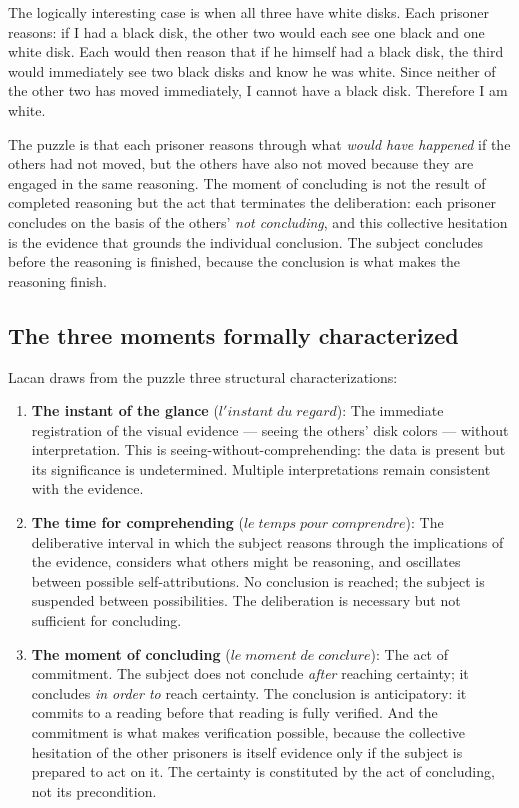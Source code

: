 \documentclass[12pt]{article}
\theoremstyle{definition}
\theoremstyle{remark}
\newcommand{\IG}{l'instant\;du\;regard}
\newcommand{\TC}{le\;temps\;pour\;comprendre}
\newcommand{\MC}{le\;moment\;de\;conclure}
\begin{document}
The logically interesting case is when all three have white disks. Each prisoner reasons: if I had a black disk, the other two would each see one black and one white disk. Each would then reason that if he himself had a black disk, the third would immediately see two black disks and know he was white. Since neither of the other two has moved immediately, I cannot have a black disk. Therefore I am white.

The puzzle is that each prisoner reasons through what \emph{would have happened} if the others had not moved, but the others have also not moved because they are engaged in the same reasoning. The moment of concluding is not the result of completed reasoning but the act that terminates the deliberation: each prisoner concludes on the basis of the others' \emph{not concluding}, and this collective hesitation is the evidence that grounds the individual conclusion. The subject concludes before the reasoning is finished, because the conclusion is what makes the reasoning finish.

\subsection{The three moments formally characterized}

Lacan draws from the puzzle three structural characterizations:

\begin{enumerate}[leftmargin=2em]
\item \textbf{The instant of the glance} ($\IG$): The immediate registration of the visual evidence --- seeing the others' disk colors --- without interpretation. This is seeing-without-comprehending: the data is present but its significance is undetermined. Multiple interpretations remain consistent with the evidence.

\item \textbf{The time for comprehending} ($\TC$): The deliberative interval in which the subject reasons through the implications of the evidence, considers what others might be reasoning, and oscillates between possible self-attributions. No conclusion is reached; the subject is suspended between possibilities. The deliberation is necessary but not sufficient for concluding.

\item \textbf{The moment of concluding} ($\MC$): The act of commitment. The subject does not conclude \emph{after} reaching certainty; it concludes \emph{in order to} reach certainty. The conclusion is anticipatory: it commits to a reading before that reading is fully verified. And the commitment is what makes verification possible, because the collective hesitation of the other prisoners is itself evidence only if the subject is prepared to act on it. The certainty is constituted by the act of concluding, not its precondition.
\end{enumerate}
\end{document}
